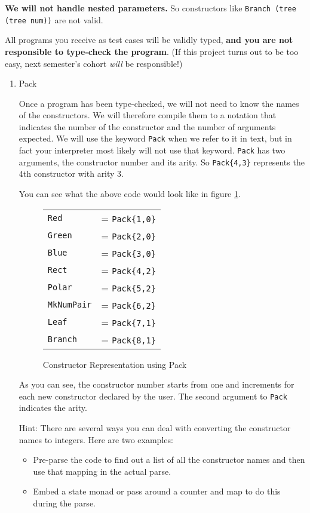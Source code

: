 \documentclass[11pt]{article}
\begin{document}
\textbf{We will not handle nested parameters.}  So constructors like \texttt{Branch (tree (tree num))} are not valid.

All programs you receive as test cases will be validly typed, \textbf{and you are not responsible to type-check the program}.  (If this
project turns out to be too easy, next semester's cohort \emph{will} be responsible!)
\begin{enumerate}
\item Pack
\label{sec:org6dc1dee}

Once a program has been type-checked, we will not need to know the names of the constructors.  We will therefore compile them
to a notation that indicates the number of the constructor and the number of arguments expected.  We will use the keyword \texttt{Pack}
when we refer to it in text, but in fact your interpreter most likely will not use that keyword.  \texttt{Pack} has two arguments,
the constructor number and its arity.  So \texttt{Pack\{4,3\}} represents the 4th constructor with arity 3.

You can see what the above code would look like in figure \ref{fig:pack}.

\begin{figure}[ht]
\centering
\begin{tabular}{ll}
\texttt{Red} & = \texttt{Pack\{1,0\}} \\
\texttt{Green} & = \texttt{Pack\{2,0\}} \\
\texttt{Blue} & = \texttt{Pack\{3,0\}} \\ [1em]
\texttt{Rect} & = \texttt{Pack\{4,2\}} \\
\texttt{Polar} & = \texttt{Pack\{5,2\}} \\ [1em]
\texttt{MkNumPair} & = \texttt{Pack\{6,2\}} \\ [1em]
\texttt{Leaf} & = \texttt{Pack\{7,1\}} \\ 
\texttt{Branch} & = \texttt{Pack\{8,1\}} \\ 
\end{tabular}
\caption{Constructor Representation using Pack}
\label{fig:pack}
\end{figure}

As you can see, the constructor number starts from one and increments for each new constructor declared by the user.
The second argument to \texttt{Pack} indicates the arity.

Hint: There are several ways you can deal with converting the constructor names to integers.  Here are two examples:
\begin{itemize}
\item Pre-parse the code to find out a list of all the constructor names and then use that mapping in the actual parse.
\item Embed a state monad or pass around a counter and map to do this during the parse.
\end{itemize}
\end{enumerate}
\end{document}
